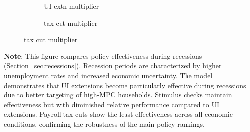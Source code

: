 \documentclass{econsocart}
\begin{document}
\begin{figure}[H]
\begin{minipage}{\textwidth}
    \begin{subfigure}[b]{.32\linewidth}
      \centering
      \caption{UI extn multiplier}
      \label{fig:recessionuirelrecession_Mult} %
    \end{subfigure}
    \hfill%
    \begin{subfigure}[b]{.32\linewidth}
      \centering
      \caption{tax cut multiplier}
      \label{fig:recessiontaxcutrelrecession_Mult} %
    \end{subfigure}
  \end{minipage}
\end{figure}
\noindent\parbox{\textwidth}{\footnotesize
  \textbf{Note}: This figure compares policy effectiveness during recessions (Section~\ref{sec:recessions}).
  Recession periods are characterized by higher unemployment rates and increased economic uncertainty.
  The model demonstrates that UI extensions become particularly effective during recessions due to
  better targeting of high-MPC households. Stimulus checks maintain effectiveness but with diminished
  relative performance compared to UI extensions. Payroll tax cuts show the least effectiveness
  across all economic conditions, confirming the robustness of the main policy rankings.
}

\vspace{1em}
\FloatBarrier %
\end{document}
